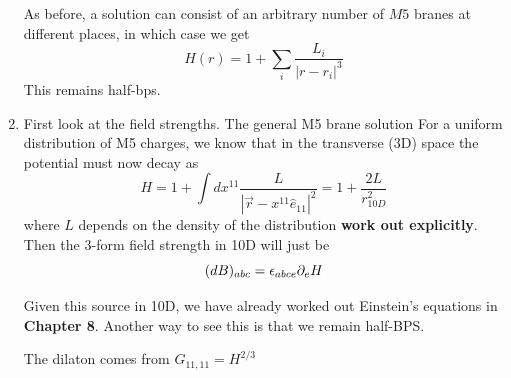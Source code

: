 \documentclass[11pt, class=article, crop=false]{standalone}
\begin{document}
\begin{enumerate}
	As before, a solution can consist of an arbitrary number of $M5$ branes at different places, in which case we get
	\[
		H(r) = 1 + \sum_{i} \frac{L_i}{|r-r_i|^3}
	\]
	This remains half-bps.

	\item First look at the field strengths. The general M5 brane solution 
	 For a uniform distribution of M5 charges, we know that in the transverse (3D) space the potential must now decay as
	\[
		H = 1 + \int dx^{11} \frac{L}{|\vec r - x^{11} \hat e_{11}|^2} = 1 + \frac{2L}{r_{10D}^2}
	\]
	where $L$ depends on the density of the distribution \textbf{work out explicitly}. Then the $3$-form field strength in 10D will just be
	\[
		(dB)_{abc} = \epsilon_{abce} \partial_e H
	\]
	
	 Given this source in 10D, we have already worked out Einstein's equations in \textbf{Chapter 8}. Another way to see this is that we remain half-BPS. 
	
	The dilaton comes from $G_{11,11} = H^{2/3}$
	
\end{enumerate}

\end{document}
